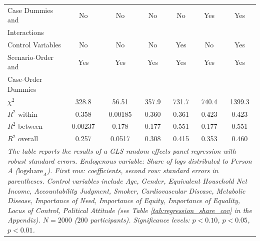 \documentclass[smallcondensed]{svjour3}
\begin{document}
\begin{landscape}
\begin{table}[ht!]
{{\begin{tabularx}{16cm}{l*{6}{c}}
   Case Dummies and              & No                        & No                        & No                        & No                        & Yes                       & Yes                      \\
   Interactions                  &                           &                           &                           &                           &                           &                          \\
   Control Variables             & No                        & No                        & No                        & Yes                       & No                        & Yes                      \\
   Scenario-Order and            & Yes                       & Yes                       & Yes                       & Yes                       & Yes                       & Yes                      \\
   Case-Order Dummies            &                           &                           &                           &                           &                           &                          \\\hline
   $\chi^2$                      & 328.8\sym{***}            &  56.51\sym{***}           & 357.9\sym{***}            & 731.7\sym{***}            & 740.4\sym{***}            & 1399.3\sym{***}          \\
   $R^2$ within                  &   0.358                   &   0.00185                 &   0.360                   &   0.361                   &   0.423                   &    0.423                 \\
   $R^2$ between                 &   0.00237                 &   0.178                   &   0.177                   &   0.551                   &   0.177                   &    0.551                 \\
   $R^2$ overall                 &   0.257                   &   0.0517                  &   0.308                   &   0.415                   &   0.353                   &    0.460                 \\\hline
\multicolumn{7}{p{15.5cm}}{\footnotesize \textit{The table reports the results of a GLS random effects panel regression with robust standard errors. Endogenous variable: Share of logs distributed to Person A ($\mbox{logshare}_A$). First row: coefficients, second row: standard errors in parentheses. Control variables include Age, Gender, Equivalent Household Net Income, Accountability Judgment, Smoker, Cardiovascular Disease, Metabolic Disease, Importance of Need, Importance of Equity, Importance of Equality, Locus of Control, Political Attitude (see Table \ref{tab:regression_share_cov} in the Appendix). $N=2000$ ($200$ participants). Significance levels: \sym{*} \(p<0.10\), \sym{**} \(p<0.05\), \sym{***} \(p<0.01\).}}
\end{tabularx}
}}
\end{table}
\end{landscape}
\end{document}

